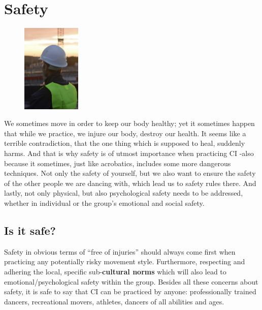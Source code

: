 \chapter{Safety}\label{ch:safety}

\begin{figure}
    \centering
    \includegraphics[width=0.25\textwidth]{images/safety}
\end{figure}

We sometimes move in order to keep our body healthy; yet it sometimes happen that while we practice, we injure our body, destroy our health.
It seems like a terrible contradiction, that the one thing which is supposed to heal, suddenly harms.
And that is why safety is of utmost importance when practicing CI -also because it sometimes, just like acrobatics, includes some more dangerous techniques.
Not only the safety of yourself, but we also want to ensure the safety of the other people we are dancing with, which lead us to safety rules there.
And lastly, not only physical, but also psychological safety needs to be addressed, whether in individual or the group's emotional and social safety.

\section{Is it safe?}\label{sec:is-it-safe?}

Safety in obvious terms of ``free of injuries'' should always come first when practicing any potentially risky movement style.
Furthermore, respecting and adhering the local, specific sub-\textbf{cultural norms} which will also lead to emotional/psychological safety within the group.
Besides all these concerns about safety, it is safe to say that CI can be practiced by anyone: professionally trained dancers, recreational movers, athletes, dancers of all abilities and ages.

